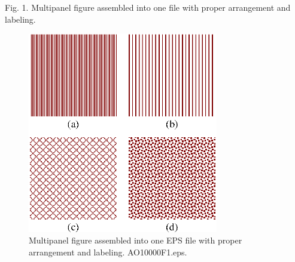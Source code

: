 \documentclass[letterpaper,12pt]{article}   %
\begin{document}
Fig. 1. Multipanel figure assembled into one file with proper
arrangement and labeling.



\newpage


  \begin{figure}[htbp]
  \centering
  \includegraphics[width=8.3cm]{OT10000F1.eps}
  \caption{Multipanel figure assembled into one EPS file with proper arrangement and labeling. AO10000F1.eps.}
  \end{figure}
\end{document}
